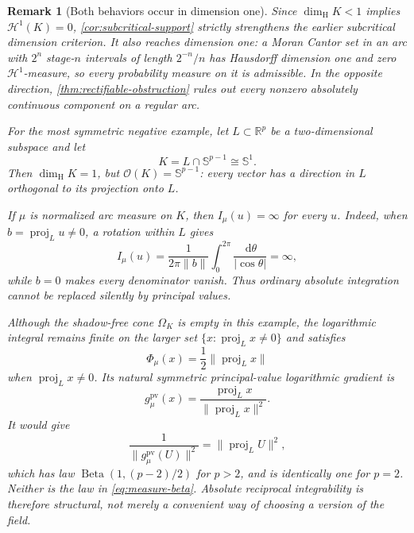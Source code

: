 \documentclass[11pt]{article}
\numberwithin{equation}{section}
\theoremstyle{thmstyleone}%
\theoremstyle{thmstyletwo}%
\newtheorem*{remark}{Remark}%
\let\cref\autoref
\newcommand{\R}{\mathbb R}
\newcommand{\sphere}{\mathbb S}
\newcommand{\dd}{\,\mathrm d}
\newcommand{\Beta}{\operatorname{Beta}}
\begin{document}
\begin{remark}[Both behaviors occur in dimension one]
\label{rem:critical-support}
Since \(\dim_{\mathrm H}K<1\) implies \(\mathcal H^1(K)=0\),
\cref{cor:subcritical-support} strictly strengthens the earlier
subcritical dimension criterion.  It also reaches dimension one: a Moran
Cantor set in an arc with \(2^n\) stage-\(n\) intervals of length
\(2^{-n}/n\) has Hausdorff dimension one and zero \(\mathcal H^1\)-measure,
so every probability measure on it is admissible.  In the opposite
direction, \cref{thm:rectifiable-obstruction} rules out every nonzero
absolutely continuous component on a regular arc.

For the most symmetric negative example, let
\(L\subset\R^p\) be a two-dimensional subspace and let
\[
  K=L\cap\sphere^{p-1}\cong\sphere^1.
\]
Then \(\dim_{\mathrm H}K=1\), but
\(\mathcal O(K)=\sphere^{p-1}\): every vector has a direction in \(L\)
orthogonal to its projection onto \(L\).

If \(\mu\) is normalized arc measure on \(K\), then
\(I_\mu(u)=\infty\) for every \(u\).  Indeed, when
\(b=\operatorname{proj}_L u\neq0\), a rotation within \(L\) gives
\[
  I_\mu(u)
  =
  \frac{1}{2\pi\|b\|}
  \int_0^{2\pi}\frac{\dd\theta}{|\cos\theta|}
  =\infty,
\]
while \(b=0\) makes every denominator vanish.  Thus ordinary absolute
integration cannot be replaced silently by principal values.

Although the shadow-free cone \(\Omega_K\) is empty in this example, the
logarithmic integral remains finite on the larger set
\(\{x:\operatorname{proj}_Lx\neq0\}\) and satisfies
\[
  \Phi_\mu(x)=\frac12\|\operatorname{proj}_Lx\|
\]
when \(\operatorname{proj}_Lx\neq0\).  Its natural symmetric
principal-value logarithmic gradient is
\[
  g_\mu^{\mathrm{pv}}(x)
  =
  \frac{\operatorname{proj}_Lx}
       {\|\operatorname{proj}_Lx\|^2}.
\]
It would give
\[
  \frac{1}{\|g_\mu^{\mathrm{pv}}(U)\|^2}
  =
  \|\operatorname{proj}_LU\|^2,
\]
which has law
\(\Beta(1,(p-2)/2)\) for \(p>2\), and is identically one for \(p=2\).
Neither is the law in \cref{eq:measure-beta}.  Absolute reciprocal
integrability is therefore structural, not merely a convenient way of
choosing a version of the field.
\end{remark}
\end{document}
